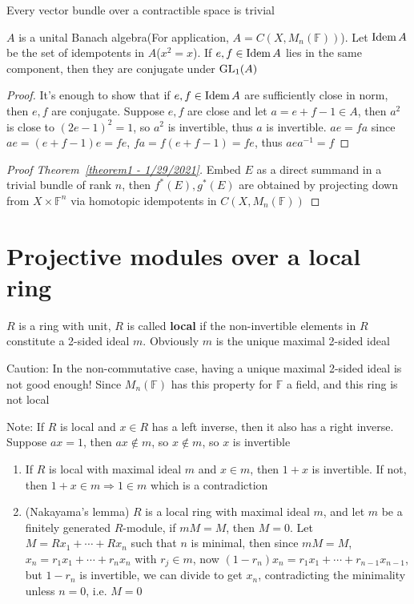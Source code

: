\documentclass[main]{subfiles}
\begin{document}
\begin{corollary}
Every vector bundle over a contractible space is trivial
\end{corollary}

\begin{theorem}\label{theorem2 - 1/29/2021}
$A$ is a unital Banach algebra(For application, $A=C(X,M_n(\mathbb F))$). Let $\operatorname{Idem} A$ be the set of idempotents in $A$($x^2=x$). If $e,f\in \operatorname{Idem} A$ lies in the same component, then they are conjugate under $\operatorname{GL}_1(A)$
\end{theorem}

\begin{proof}
It's enough to show that if $e,f\in \operatorname{Idem} A$ are sufficiently close in norm, then $e,f$ are conjugate. Suppose $e,f$ are close and let $a=e+f-1\in A$, then $a^2$ is close to $(2e-1)^2=1$, so $a^2$ is invertible, thus $a$ is invertible. $ae=fa$ since $ae=(e+f-1)e=fe$, $fa=f(e+f-1)=fe$, thus $aea^{-1}=f$
\end{proof}

\begin{proof}[Proof Theorem~\ref{theorem1 - 1/29/2021}]
Embed $E$ as a direct summand in a trivial bundle of rank $n$, then $f^*(E),g^*(E)$ are obtained by projecting down from $X\times\mathbb F^n$ via homotopic idempotents in $C(X,M_n(\mathbb F))$
\end{proof}

\section{Projective modules over a local ring}

\begin{definition}
$R$ is a ring with unit, $R$ is called \textbf{local} if the non-invertible elements in $R$ constitute a 2-sided ideal $m$. Obviously $m$ is the unique maximal 2-sided ideal
\end{definition}

Caution: In the non-commutative case, having a unique maximal 2-sided ideal is not good enough! Since $M_n(\mathbb F)$ has this property for $\mathbb F$ a field, and this ring is not local

Note: If $R$ is local and $x\in R$ has a left inverse, then it also has a right inverse. Suppose $ax=1$, then $ax\notin m$, so $x\notin m$, so $x$ is invertible

\begin{fact}
\begin{enumerate}
\item If $R$ is local with maximal ideal $m$ and $x\in m$, then $1+x$ is invertible. If not, then $1+x\in m\Rightarrow1\in m$ which is a contradiction
\item (Nakayama's lemma) $R$ is a local ring with maximal ideal $m$, and let $m$ be a finitely generated $R$-module, if $mM=M$, then $M=0$. Let $M=Rx_1+\cdots +Rx_n$ such that $n$ is minimal, then since $mM=M$, $x_n=r_1x_1+\cdots +r_nx_n$ with $r_j\in m$, now $(1-r_n)x_n=r_1x_1+\cdots+r_{n-1}x_{n-1}$, but $1-r_n$ is invertible, we can divide to get $x_n$, contradicting the minimality unless $n=0$, i.e. $M=0$
\end{enumerate}
\end{fact}
\end{document}
